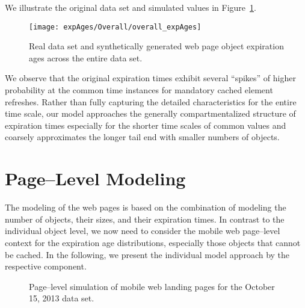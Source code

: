\documentclass[letterpaper,conference]{IEEEtran}
\begin{document}
We illustrate the original data set and simulated values in Figure~\ref{fig:oexp}.
\begin{figure}[b]
	\centering
	\texttt{[image: expAges/Overall/overall\_expAges]}
	\caption{Real data set and synthetically generated web page object expiration ages across the entire data set.}
	\label{fig:oexp}
\end{figure}
We observe that the original expiration times exhibit several ``spikes'' of higher probability at the common time instances for mandatory cached element refreshes. 
Rather than fully capturing the detailed characteristics for the entire time scale, our model approaches the generally compartmentalized structure of expiration times especially for the shorter time scales of common values and coarsely approximates the longer tail end with smaller numbers of objects.

\section{Page--Level Modeling}
\label{s:page}
The modeling of the web pages is based on the combination of modeling the number of objects, their sizes, and their expiration times.
In contrast to the individual object level, we now need to consider the mobile web page--level context for the expiration age distributions, especially those objects that cannot be cached.
In the following, we present the individual model approach by the respective component.

\begin{figure}[t!]
	\centering
	\qquad
	\qquad
	\caption{Page--level simulation of mobile web landing pages for the October 15, 2013 data set.\label{fig:pages}}
\end{figure}
\end{document}

